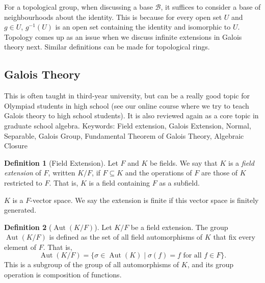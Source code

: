 \documentclass{article}
\theoremstyle{definition}
\newtheorem{definition}{Definition}[section]
\theoremstyle{definition}
\theoremstyle{definition}
\begin{document}
For a topological group, when discussing a base $\mathcal{B}$, it suffices to consider a base of neighbourhoods about the identity. This is because for every open set $U$ and $g\in U$, $g^{-1}(U)$ is an open set containing the identity and isomorphic to $U$.
\newline\newline
Topology comes up as an issue when we discuss infinite extensions in Galois theory next.
\newline\newline
Similar definitions can be made for topological rings.


\subsection{Galois Theory} 

This is often taught in third-year university, but can be a really good topic for Olympiad students in high school (see our online course where we try to teach Galois theory to high school students). It is also reviewed again as a core topic in graduate school algebra.
\newline\newline
Keywords: Field extension, Galois Extension, Normal, Separable, Galois Group, Fundamental Theorem of Galois Theory, Algebraic Closure

\begin{definition}[Field Extension]
Let \( F \) and \( K \) be fields. We say that \( K \) is a \emph{field extension} of \( F \), written \( K/F \), if \( F \subseteq K \) and the operations of \( F \) are those of \( K \) restricted to \( F \). That is, \( K \) is a field containing \( F \) as a subfield.
\end{definition}

$K$ is a $F$-vector space. We say the extension is finite if this vector space is finitely generated.



\begin{definition}[\( \operatorname{Aut}(K/F) \)]
Let \( K/F \) be a field extension. The group \( \operatorname{Aut}(K/F) \) is defined as the set of all field automorphisms of \( K \) that fix every element of \( F \). That is,
\[
\operatorname{Aut}(K/F) = \{ \sigma \in \operatorname{Aut}(K) \mid \sigma(f) = f \text{ for all } f \in F \}.
\]
This is a subgroup of the group of all automorphisms of \( K \), and its group operation is composition of functions. 
\end{definition}
\end{document}
